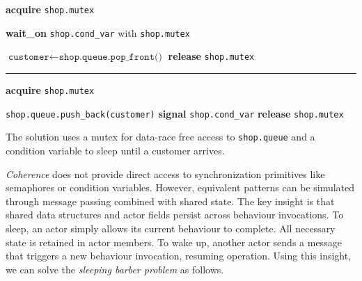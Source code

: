 \begin{algorithmic}[1]
        \State \textbf{acquire} \texttt{shop.mutex}
        
            \State {}
            \State \textbf{wait\_on} \texttt{shop.cond\_var} with \texttt{shop.mutex}
            \State {}
            \State {}
        \EndIf
        
        \State $\texttt{customer} \gets \texttt{shop.queue.pop\_front()}$
        \State \textbf{release} \texttt{shop.mutex}
        
        \State {}
    \EndWhile
\EndProcedure

\medskip
\hrule
\medskip

    \State \textbf{acquire} \texttt{shop.mutex}
    
        \State \texttt{shop.queue.push\_back(customer)}
        \State {}
        \State \textbf{signal} \texttt{shop.cond\_var}
    \EndIf
    \State \textbf{release} \texttt{shop.mutex}
\EndProcedure
\end{algorithmic}

The solution uses a mutex for data-race free access to \texttt{shop.queue} and a condition variable to sleep until a customer arrives.

\textit{Coherence} does not provide direct access to synchronization primitives like semaphores or condition variables. However, equivalent patterns can be simulated through message passing combined with shared state. The key insight is that shared data structures and actor fields persist across behaviour invocations. To sleep, an actor simply allows its current behaviour to complete. All necessary state is retained in actor members. To wake up, another actor sends a message that triggers a new behaviour invocation, resuming operation. Using this insight, we can solve the \textit{sleeping barber problem} as follows.

